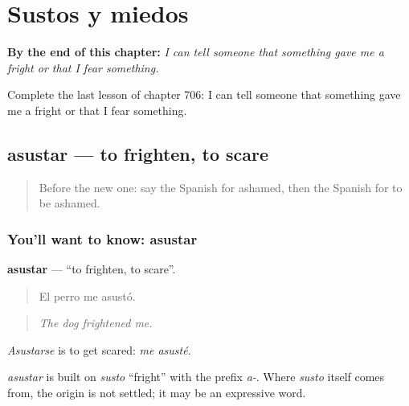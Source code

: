 
\chapter{Sustos y miedos}
\label{ch:es-sustos-y-miedos}

\begin{chapteropening}
\textbf{By the end of this chapter:} \emph{I can tell someone that something gave me a fright or that I fear something.}

Complete the last lesson of chapter 706: I can tell someone that something gave me a fright or that I fear something.
\end{chapteropening}

\section[asustar]{asustar — to frighten, to scare}

\label{lesson:ES-C706-asustar}



\begin{quote}
Before the new one: say the Spanish for ashamed, then the Spanish for to be ashamed.
\end{quote}

\subsection*{You'll want to know: asustar}
\textbf{asustar} — \textquotedblleft{}to frighten, to scare\textquotedblright{}.

\begin{quote}
El perro me asustó.
\end{quote}

\begin{quote}
\emph{The dog frightened me.}
\end{quote}

\emph{Asustarse} is to get scared: \emph{me asusté}.

\begin{cousinweb}
\emph{asustar} is built on \emph{susto} \textquotedblleft{}fright\textquotedblright{} with the prefix \emph{a-}. Where \emph{susto} itself comes from, the origin is not settled; it may be an expressive word.
\end{cousinweb}


